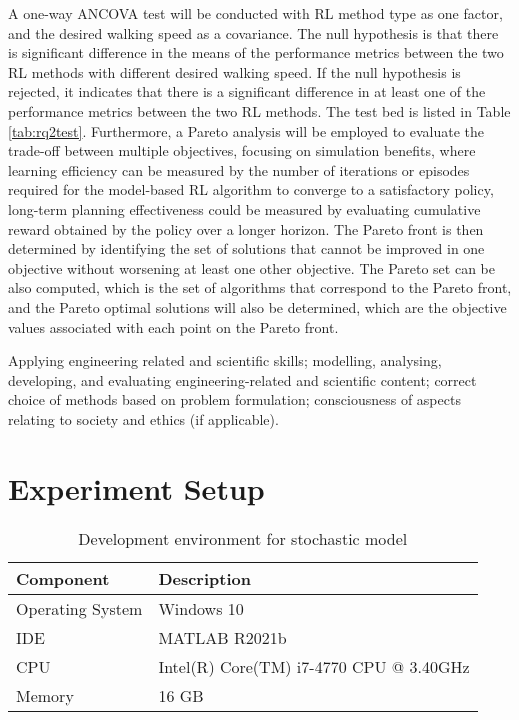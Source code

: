 A one-way ANCOVA test will be conducted with RL method type as one factor, and the desired walking speed as a covariance. The null hypothesis is that there is significant difference in the means of the performance metrics between the two RL methods with different desired walking speed. If the null hypothesis is rejected, it indicates that there is a significant difference in at least one of the performance metrics between the two RL methods. The test bed is listed in Table \ref{tab:rq2test}. Furthermore, a Pareto analysis will be employed to evaluate the trade-off between multiple objectives, focusing on simulation benefits, where learning efficiency can be measured by the number of iterations or episodes required for the model-based RL algorithm to converge to a satisfactory policy, long-term planning effectiveness could be measured by evaluating cumulative reward obtained by the policy over a longer horizon. The Pareto front is then determined by identifying the set of solutions that cannot be improved in one objective without worsening at least one other objective. The Pareto set can be also computed, which is the set of algorithms that correspond to the Pareto front, and the Pareto optimal solutions will also be determined, which are the objective values associated with each point on the Pareto front. 


Applying engineering related and scientific skills; modelling, analysing, developing, and evaluating engineering-related and scientific content; correct choice of methods based on problem formulation; consciousness of aspects relating to society and ethics (if applicable).

\section{Experiment Setup}

\begin{table}[hp]
\centering
\begin{tabular}{ll}
\toprule
Component        & Description                             \\\midrule
Operating System & Windows 10                              \\
IDE              & MATLAB R2021b                           \\
CPU              & Intel(R) Core(TM) i7-4770 CPU @ 3.40GHz \\
Memory           & 16 GB                                   \\\bottomrule
\end{tabular}%
\caption{Development environment for stochastic model}
\label{tab:env}
\end{table}

